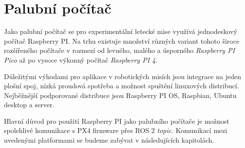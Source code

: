 \section{Palubní počítač}

Jako palubní počítač se pro experimentální letecké mise využívá jednodeskový počítač Raspberry PI. Na trhu existuje množství různých variant tohoto široce rozšířeného počítače v rozmezí od levného, malého a úsporného  \textit{Raspberry PI Pico} až po vysoce výkonný počítač \textit{Raspberry PI 4}.

Důležitými výhodami pro aplikace v robotických misích jsou integrace na jeden plošní spoj, nízká proudová spotřeba a možnost spuštění linuxových distribucí. Nejběžnější podporované distribuce jsou Raspberry PI OS, Raspbian, Ubuntu desktop a server.

Hlavní důvod pro použití Raspberry PI jako palubního počítače je možnost spolehlivé komunikace s PX4 firmware přes ROS 2 \textit{topic}. Komunikací mezi uvedenými platformami se budeme zabývat v následujících kapitolách.